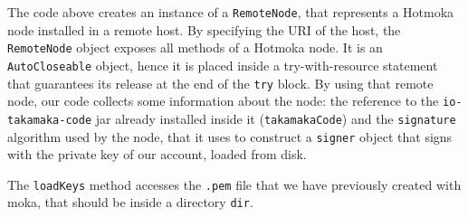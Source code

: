 The code above creates an instance of a \texttt{RemoteNode},
that represents a Hotmoka
node installed in a remote host. By specifying the URI of the host, the \texttt{RemoteNode} object
exposes all methods of a Hotmoka node. It is an \texttt{AutoCloseable} object,
hence it is placed inside
a try-with-resource statement that guarantees its release at the end of the \texttt{try} block.
By using that remote node, our code collects
some information about the node: the reference to the \texttt{io-takamaka-code} jar already
installed inside it (\texttt{takamakaCode}) and the \texttt{signature} algorithm used
by the node,
that it uses to construct a \texttt{signer} object that signs with the private key of our account,
loaded from disk.

The \texttt{loadKeys} method accesses the \texttt{.pem} file that we have previously created
with moka, that should be inside a directory \texttt{dir}.


